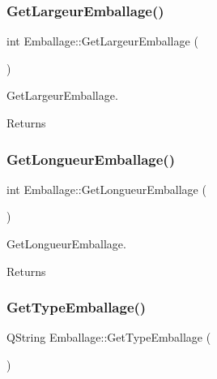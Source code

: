 \subsubsection{\texorpdfstring{Get\+Largeur\+Emballage()}{GetLargeurEmballage()}}
{\footnotesize\ttfamily int Emballage\+::\+Get\+Largeur\+Emballage (\begin{DoxyParamCaption}{ }\end{DoxyParamCaption})}



Get\+Largeur\+Emballage. 

\begin{DoxyReturn}{Returns}

\end{DoxyReturn}
\mbox{\label{class_emballage_ab38aa0657c07c5ba3532be21334ab2f7}} 
\subsubsection{\texorpdfstring{Get\+Longueur\+Emballage()}{GetLongueurEmballage()}}
{\footnotesize\ttfamily int Emballage\+::\+Get\+Longueur\+Emballage (\begin{DoxyParamCaption}{ }\end{DoxyParamCaption})}



Get\+Longueur\+Emballage. 

\begin{DoxyReturn}{Returns}

\end{DoxyReturn}
\mbox{\label{class_emballage_a5662f2d4aae61a7c999a4d26dd82fa14}} 
\subsubsection{\texorpdfstring{Get\+Type\+Emballage()}{GetTypeEmballage()}}
{\footnotesize\ttfamily Q\+String Emballage\+::\+Get\+Type\+Emballage (\begin{DoxyParamCaption}{ }\end{DoxyParamCaption})}



